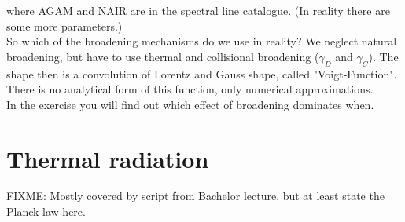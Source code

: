 \documentclass[a4paper,fleqn]{article}
\begin{document}
where AGAM and NAIR are in the spectral line catalogue. (In reality there are some more parameters.) \\

So which of the broadening mechanisms do we use in reality? We neglect natural broadening, but have to use thermal and collisional broadening ($\gamma_{D}$ and $\gamma_{C}$). The shape then is a convolution of Lorentz and Gauss shape, called "Voigt-Function". There is no analytical form of this function, only numerical approximations. \\

In the exercise you will find out which effect of broadening dominates when. 

\section{Thermal radiation}

FIXME: Mostly covered by script from Bachelor lecture, but at least
state the Planck law here.

\end{document}
